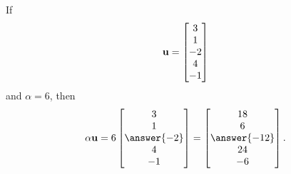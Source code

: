 \documentclass{ximera}
\begin{document}
\begin{example}
  If
  \[
    \mathbf{u}=\begin{bmatrix}3\\1\\-2\\4\\-1\end{bmatrix}
  \]
  and $\alpha=6$, then
  \[
    \alpha\vect{u}=
    6\colvector{3\\1\\\answer{-2}\\4\\-1}=
    \colvector{18\\6\\\answer{-12}\\24\\-6}.
  \]
\end{example}
\end{document}
